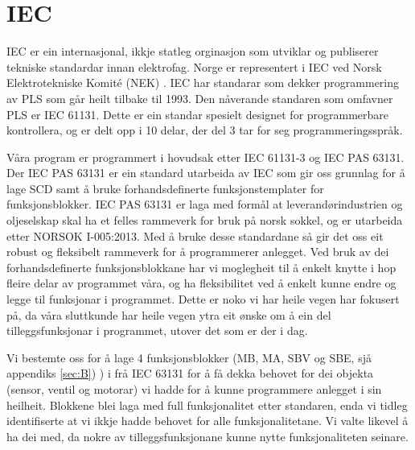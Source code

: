 \section{IEC}
\thispagestyle{fancy}


\gls{IEC} \citep{IEC} er ein internasjonal, ikkje statleg orginasjon som utviklar og publiserer tekniske standardar innan elektrofag. 
Norge er representert i IEC ved Norsk Elektrotekniske Komité (NEK) \citep{IEC-SNL}. 
IEC har standarar som dekker programmering av PLS som går heilt tilbake til 1993\citep{Wiki-93}. 
Den nåverande standaren som omfavner PLS er IEC 61131\citep{IEC-61131}. Dette er ein standar spesielt designet for programmerbare kontrollera, og er delt opp i 10 delar, der del 3 tar for seg programmeringsspråk. 

Våra program er programmert i hovudsak etter IEC 61131-3 og IEC \gls{PAS} 63131\citep{IEC-63131}. 
Der IEC PAS 63131 er ein standard utarbeida av IEC som gir oss grunnlag for å lage \gls{SCD} samt å bruke forhandsdefinerte funksjonstemplater for funksjonsblokker. 
IEC PAS 63131 er laga med formål at leverandørindustrien og oljeselskap skal ha et felles rammeverk for bruk på norsk sokkel, og er utarbeida etter NORSOK I-005:2013.
Med å bruke desse standardane så gir det oss eit robust og fleksibelt rammeverk for å programmerer anlegget. 
Ved bruk av dei forhandsdefinerte funksjonsblokkane har vi moglegheit til å enkelt knytte i hop fleire delar av programmet våra, og ha fleksibilitet ved å enkelt kunne endre og legge til funksjonar i programmet. 
Dette er noko vi har heile vegen har fokusert på, da våra sluttkunde har heile vegen ytra eit ønske om å ein del tilleggsfunksjonar i programmet, utover det som er der i dag. 

Vi bestemte oss for å lage 4 funksjonsblokker (MB, MA, SBV og SBE, sjå appendiks \ref{sec:B}) ) i frå IEC 63131 for å få dekka behovet for dei objekta (sensor, ventil og motorar) vi hadde for å kunne programmere anlegget i sin heilheit. 
Blokkene blei laga med full funksjonalitet etter standaren, enda vi tidleg identifiserte at vi ikkje hadde behovet for alle funksjonalitetane. Vi valte likevel å ha dei med, da nokre av tilleggsfunksjonane kunne nytte funksjonaliteten seinare.
\newpage
